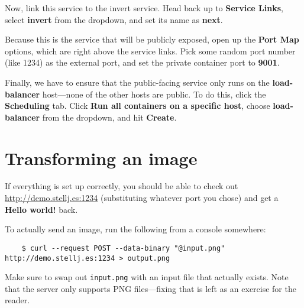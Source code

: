 Now, link this service to the invert service. Head back up to \textbf{Service Links}, select \textbf{invert} from the dropdown, and set its name as \textbf{next}.

Because this is the service that will be publicly exposed, open up the \textbf{Port Map} options, which are right above the service links. Pick some random port number (like 1234) as the external port, and set the private container port to \textbf{9001}.

Finally, we have to ensure that the public-facing service only runs on the \textbf{load-balancer} host---none of the other hosts are public. To do this, click the \textbf{Scheduling} tab. Click \textbf{Run all containers on a specific host}, choose \textbf{load-balancer} from the dropdown, and hit \textbf{Create}.

\section*{Transforming an image}

If everything is set up correctly, you should be able to check out \url{http://demo.stellj.es:1234} (substituting whatever port you chose) and get a \textbf{Hello world!} back.

To actually send an image, run the following from a console somewhere:

\begin{verbatim}
    $ curl --request POST --data-binary "@input.png" http://demo.stellj.es:1234 > output.png
\end{verbatim}

Make sure to swap out \texttt{input.png} with an input file that actually exists. Note that the server only supports PNG files---fixing that is left as an exercise for the reader.
